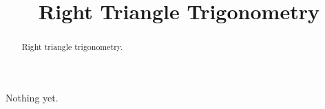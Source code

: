 \documentclass{ximera}
\title{Right Triangle Trigonometry}
\begin{document}
\begin{abstract}
Right triangle trigonometry.
\end{abstract}
\maketitle


Nothing yet.
\end{document}
